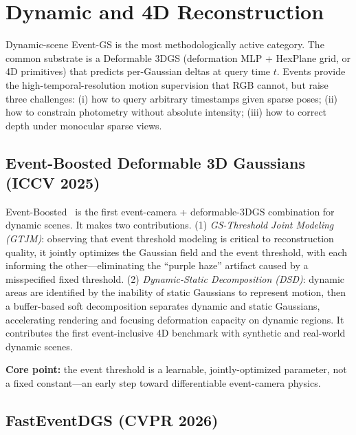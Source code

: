 \section{Dynamic and 4D Reconstruction}
\label{sec:dynamic}

Dynamic-scene Event-GS is the most methodologically active category. The common substrate is a Deformable 3DGS (deformation MLP + HexPlane grid, or 4D primitives) that predicts per-Gaussian deltas at query time $t$. Events provide the high-temporal-resolution motion supervision that RGB cannot, but raise three challenges: (i) how to query arbitrary timestamps given sparse poses; (ii) how to constrain photometry without absolute intensity; (iii) how to correct depth under monocular sparse views.

\subsection{Event-Boosted Deformable 3D Gaussians (ICCV 2025)}
\label{sec:dynamic:boosted}

Event-Boosted~\cite{xu2025eventboosted} is the first event-camera + deformable-3DGS combination for dynamic scenes. It makes two contributions. (1) \emph{GS-Threshold Joint Modeling (GTJM)}: observing that event threshold modeling is critical to reconstruction quality, it jointly optimizes the Gaussian field and the event threshold, with each informing the other---eliminating the ``purple haze'' artifact caused by a misspecified fixed threshold. (2) \emph{Dynamic-Static Decomposition (DSD)}: dynamic areas are identified by the inability of static Gaussians to represent motion, then a buffer-based soft decomposition separates dynamic and static Gaussians, accelerating rendering and focusing deformation capacity on dynamic regions. It contributes the first event-inclusive 4D benchmark with synthetic and real-world dynamic scenes.

\textbf{Core point:} the event threshold is a learnable, jointly-optimized parameter, not a fixed constant---an early step toward differentiable event-camera physics.

\subsection{FastEventDGS (CVPR 2026)}
\label{sec:dynamic:fast}


